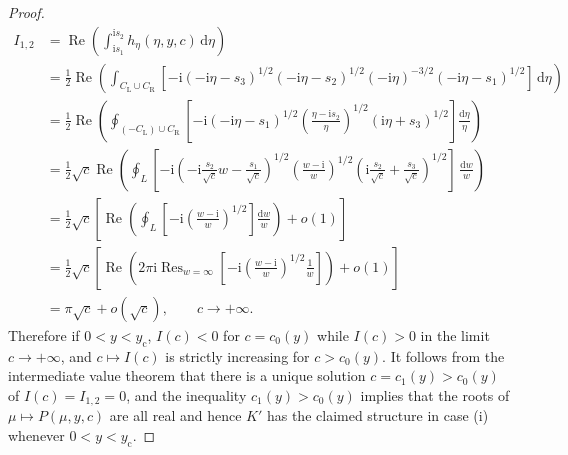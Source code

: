 \begin{proof}
\begin{align*}
I_{1,2}&=\operatorname{Re}\left(\int_{\mathrm{i} s_1}^{\mathrm{i} s_2}h_\eta(\eta,y,c)\,\mathrm{d}\eta\right) \\ &=
\frac{1}{2}\operatorname{Re}\left(\int_{C_\mathrm{L}\cup C_\mathrm{R}}\left[-\mathrm{i}(-\mathrm{i}\eta-s_3)^{1/2}(-\mathrm{i}\eta-s_2)^{1/2}(-\mathrm{i}\eta)^{-3/2}(-\mathrm{i}\eta-s_1)^{1/2}\right]\,\mathrm{d}\eta\right)\\
&=\frac{1}{2}\operatorname{Re}\left(\oint_{(-C_\mathrm{L})\cup C_\mathrm{R}}\left[-\mathrm{i} (-\mathrm{i}\eta-s_1)^{1/2}\left(\frac{\eta-\mathrm{i} s_2}{\eta}\right)^{1/2}(\mathrm{i}\eta+s_3)^{1/2}\right]\frac{\mathrm{d}\eta}{\eta}\right)\\
&=\frac{1}{2}\sqrt{c}\operatorname{Re}\left(\oint_{L}\left[-\mathrm{i}\left(-\mathrm{i}\frac{s_2}{\sqrt{c}}w-\frac{s_1}{\sqrt{c}}\right)^{1/2}\left(\frac{w-\mathrm{i}}{w}\right)^{1/2}\left(\mathrm{i}\frac{s_2}{\sqrt{c}}+\frac{s_3}{\sqrt{c}}\right)^{1/2}\right]\,\frac{\mathrm{d} w}{w}\right)\\
&=\frac{1}{2}\sqrt{c}\left[\operatorname{Re}\left(\oint_L\left[-\mathrm{i}\left(\frac{w-\mathrm{i}}{w}\right)^{1/2}\right]\frac{\mathrm{d} w}{w}\right)+o(1)\right] \\ %
&=\frac{1}{2}\sqrt{c}\left[\operatorname{Re}\left(2\pi\mathrm{i}\mathop{\mathrm{Res}}_{w=\infty}
\left[-\mathrm{i}\left(\frac{w-\mathrm{i}}{w}\right)^{1/2}\frac{1}{w}\right]\right)+o(1)\right] \\ %
&=\pi\sqrt{c}+o(\sqrt{c}),\qquad c\to+\infty.
\end{align*}
Therefore if $0<y<y_\mathrm{c}$, $I(c)<0$ for $c=c_0(y)$ while $I(c)>0$ in the limit $c\to+\infty$, and $c\mapsto I(c)$ is strictly increasing for $c>c_0(y)$. It follows from the intermediate value theorem that there is a unique solution $c=c_1(y)>c_0(y)$ of $I(c)=I_{1,2}=0$, and the inequality $c_1(y)>c_0(y)$ implies that the roots of $\mu\mapsto P(\mu,y,c)$ are all real and hence $K'$ has the claimed structure in case (i) whenever $0<y<y_\mathrm{c}$.


\end{proof}
